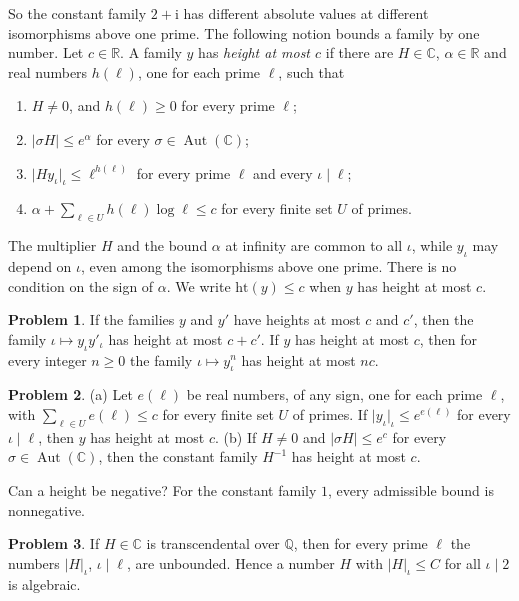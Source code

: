\documentclass[reqno]{amsart}
\theoremstyle{definition}
\newtheorem{problem}{Problem}[section]
\theoremstyle{plain}
\newcommand{\Q}{\mathbb{Q}}
\newcommand{\R}{\mathbb{R}}
\newcommand{\C}{\mathbb{C}}
\newcommand{\ii}{\mathrm{i}}
\newcommand{\Aut}{\operatorname{Aut}}
\begin{document}
So the constant family \(2 + \ii\) has different absolute values at different isomorphisms above one prime.  The following notion bounds a family by one number.  Let \(c \in \R\).  A family \(y\) has \emph{height at most \(c\)} if there are \(H \in \C\), \(\alpha \in \R\) and real numbers \(h(\ell)\), one for each prime \(\ell\), such that
\begin{enumerate}
\item[(i)] \(H \ne 0\), and \(h(\ell) \ge 0\) for every prime \(\ell\);
\item[(ii)] \(\lvert \sigma H \rvert \le e^\alpha\) for every \(\sigma \in \Aut(\C)\);
\item[(iii)] \(\lvert H y_\iota \rvert_\iota \le \ell^{h(\ell)}\) for every prime \(\ell\) and every \(\iota \mid \ell\);
\item[(iv)] \(\alpha + \sum_{\ell \in U} h(\ell) \log \ell \le c\) for every finite set \(U\) of primes.
\end{enumerate}
The multiplier \(H\) and the bound \(\alpha\) at infinity are common to all \(\iota\), while \(y_\iota\) may depend on \(\iota\), even among the isomorphisms above one prime.  There is no condition on the sign of \(\alpha\).  We write \(\mathrm{ht}(y) \le c\) when \(y\) has height at most \(c\).

\begin{problem}\label{pr:height-mul}
If the families \(y\) and \(y'\) have heights at most \(c\) and \(c'\), then the family \(\iota \mapsto y_\iota y'_\iota\) has height at most \(c + c'\).  If \(y\) has height at most \(c\), then for every integer \(n \ge 0\) the family \(\iota \mapsto y_\iota^n\) has height at most \(nc\).
\end{problem}

\begin{problem}\label{pr:height-easy}
(a) Let \(e(\ell)\) be real numbers, of any sign, one for each prime \(\ell\), with \(\sum_{\ell \in U} e(\ell) \le c\) for every finite set \(U\) of primes.  If \(\lvert y_\iota \rvert_\iota \le e^{e(\ell)}\) for every \(\iota \mid \ell\), then \(y\) has height at most \(c\).
(b) If \(H \ne 0\) and \(\lvert \sigma H \rvert \le e^c\) for every \(\sigma \in \Aut(\C)\), then the constant family \(H^{-1}\) has height at most \(c\).
\end{problem}

Can a height be negative?  For the constant family \(1\), every admissible bound is nonnegative.

\begin{problem}\label{pr:transcendental}
If \(H \in \C\) is transcendental over \(\Q\), then for every prime \(\ell\) the numbers \(\lvert H \rvert_\iota\), \(\iota \mid \ell\), are unbounded.  Hence a number \(H\) with \(\lvert H \rvert_\iota \le C\) for all \(\iota \mid 2\) is algebraic.
\end{problem}
\end{document}
